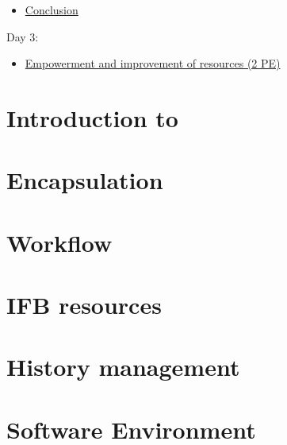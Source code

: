 \documentclass{beamer}
\begin{document}
\begin{frame}
\begin{itemize}
    \item \hyperlink{Conclusion}{Conclusion}
\end{itemize}
Day 3: 
\begin{itemize}
    \item \hyperlink{Improvement}{Empowerment and improvement of resources (2 PE)}
\end{itemize}
\end{frame}
\label{Introduction}
\section[Introduction]{Introduction to \FAIRB}

\label{Encapsulation}
\section[Encapsulation]{Encapsulation}

\label{Workflow}
\section[Pipeline]{Workflow}

\label{IFB}
\section[IFB]{IFB resources}

\label{History}
\section[History]{History management}

\label{Software_Environment}
\section[Environment]{Software Environment}

\label{Notebooks}
\end{document}
